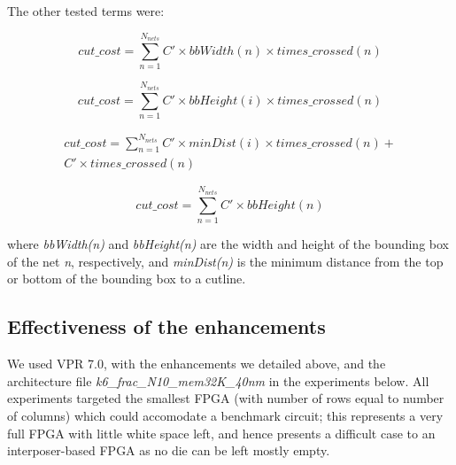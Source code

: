 \documentclass{sig-alternate-2013}
\begin{document}
The other tested terms were:


\begin{equation} \label{eq:cost1}
cut\_cost = \sum_{n=1}^{N_{nets}} C' \times bbWidth(n) \times times\_crossed(n)
\end{equation}

\begin{equation} \label{eq:cost2}
cut\_cost = \sum_{n=1}^{N_{nets}} C' \times bbHeight(i) \times times\_crossed(n)
\end{equation}

\begin{equation} \label{eq:cost4}
\begin{split}
cut\_cost = \sum_{n=1}^{N_{nets}} C' \times minDist(i) \times times\_crossed(n) +\\
C' \times times\_crossed(n)
\end{split}
\end{equation}

\begin{equation} \label{eq:cost5}
cut\_cost = \sum_{n=1}^{N_{nets}} C' \times bbHeight(n)
\end{equation}

where \textit{bbWidth(n)} and \textit{bbHeight(n)} are the width and height of the bounding box of the net \textit{n}, respectively, and \textit{minDist(n)} is the minimum distance from the top or bottom of the bounding box to a cutline. 

\subsection{Effectiveness of the enhancements}
\label{sec:CADeffect}

We used VPR 7.0, with the enhancements we detailed above, and the architecture file \textit{k6\_frac\_N10\_mem32K\_40nm} in the experiments below. All experiments targeted the smallest FPGA (with number of rows equal to number of columns) which could accomodate a benchmark circuit; this represents a very full FPGA with little white space left, and hence presents a difficult case to an interposer-based FPGA as no die can be left mostly empty.
\end{document}
